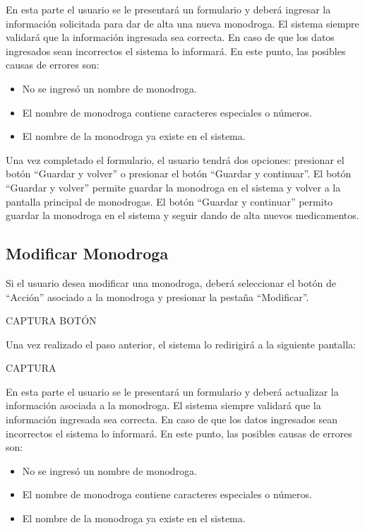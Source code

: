 \documentclass[letterpaper,10pt,spanish]{sphinxmanual}
\begin{document}
En esta parte el usuario se le presentará un formulario y deberá ingresar la información solicitada para dar de alta una nueva monodroga.
El sistema siempre validará que la información ingresada sea correcta. En caso de que los datos ingresados sean incorrectos el sistema lo informará.
En este punto, las posibles causas de errores son:
\begin{itemize}
\item {} 
No se ingresó un nombre de monodroga.

\item {} 
El nombre de monodroga contiene caracteres especiales o números.

\item {} 
El nombre de la monodroga ya existe en el sistema.

\end{itemize}

Una vez completado el formulario, el usuario tendrá dos opciones: presionar el botón “Guardar y volver” o presionar el botón “Guardar y continuar”.
El botón “Guardar y volver” permite guardar la monodroga en el sistema y volver a la pantalla principal de monodrogas.
El botón “Guardar y continuar” permito guardar la monodroga en el sistema y seguir dando de alta nuevos medicamentos.


\subsection{Modificar Monodroga}
\label{monodrogas:modificar-monodroga}
Si el usuario desea modificar una monodroga, deberá seleccionar el botón de “Acción” asociado a la monodroga y presionar la pestaña “Modificar”.

CAPTURA BOTÓN

Una vez realizado el paso anterior, el sistema lo redirigirá a la siguiente pantalla:

CAPTURA

En esta parte el usuario se le presentará un formulario y deberá actualizar la información asociada a la monodroga.
El sistema siempre validará que la información ingresada sea correcta. En caso de que los datos ingresados sean incorrectos el sistema lo informará.
En este punto, las posibles causas de errores son:
\begin{itemize}
\item {} 
No se ingresó un nombre de monodroga.

\item {} 
El nombre de monodroga contiene caracteres especiales o números.

\item {} 
El nombre de la monodroga ya existe en el sistema.

\end{itemize}
\end{document}
